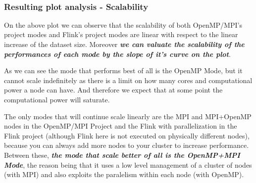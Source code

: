 \documentclass[11pt]{article}
\begin{document}
    \begin{center}
    \end{center}
    { \hspace*{\fill} \\}
    
    \hypertarget{resulting-plot-analysis---scalability}{%
\subsubsection{Resulting plot analysis -
Scalability}\label{resulting-plot-analysis---scalability}}

On the above plot we can observe that the scalability of both
OpenMP/MPI's project modes and Flink's project modes are linear with
respect to the linear increase of the dataset size. Moreover
\textbf{\emph{we can valuate the scalability of the performances of each
mode by the slope of it's curve on the plot}}.

As we can see the mode that performs best of all is the OpenMP Mode, but
it cannot scale indefinitely as there is a limit on how many cores and
computational power a node can have. And therefore we expect that at
some point the computational power will saturate.

The only modes that will continue scale linearly are the MPI and
MPI+OpenMP nodes in the OpenMP/MPI Project and the Flink with
parallelization in the Flink project (although Flink here is not
executed on physically different nodes), because you can always add more
nodes to your cluster to increase performance. Between these,
\textbf{\emph{the mode that scale better of all is the OpenMP+MPI
Mode}}, the reason being that it uses a low level management of a
cluster of nodes (with MPI) and also exploits the paralelism within each
node (with OpenMP).


    
    
    
    
\end{document}
